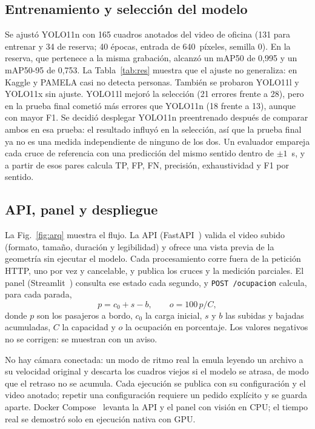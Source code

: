 \documentclass[conference,a4paper]{IEEEtran}
\begin{document}
\subsection{Entrenamiento y selección del modelo}\label{sec:sel}
Se ajustó YOLO11n con 165 cuadros anotados del video de oficina (131 para entrenar y 34 de reserva; 40 épocas, entrada de 640~píxeles, semilla 0). En la reserva, que pertenece a la misma grabación, alcanzó un mAP50 de 0,995 y un mAP50-95 de 0,753. La Tabla~\ref{tab:res} muestra que el ajuste no generaliza: en Kaggle y PAMELA casi no detecta personas. También se probaron YOLO11l y YOLO11x sin ajuste. YOLO11l mejoró la selección (21 errores frente a 28), pero en la prueba final cometió más errores que YOLO11n (18 frente a 13), aunque con mayor F1. Se decidió desplegar YOLO11n preentrenado después de comparar ambos en esa prueba: el resultado influyó en la selección, así que la prueba final ya no es una medida independiente de ninguno de los dos. Un evaluador empareja cada cruce de referencia con una predicción del mismo sentido dentro de $\pm1$~s, y a partir de esos pares calcula TP, FP, FN, precisión, exhaustividad y F1 por sentido.

\subsection{API, panel y despliegue}
La Fig.~\ref{fig:arq} muestra el flujo. La API (FastAPI~\cite{fastapi}) valida el video subido (formato, tamaño, duración y legibilidad) y ofrece una vista previa de la geometría sin ejecutar el modelo. Cada procesamiento corre fuera de la petición HTTP, uno por vez y cancelable, y publica los cruces y la medición parciales. El panel (Streamlit~\cite{streamlit}) consulta ese estado cada segundo, y \texttt{POST /ocupacion} calcula, para cada parada,
\begin{equation}
p = c_0 + s - b, \qquad o = 100\,p/C,
\end{equation}
donde $p$ son los pasajeros a bordo, $c_0$ la carga inicial, $s$ y $b$ las subidas y bajadas acumuladas, $C$ la capacidad y $o$ la ocupación en porcentaje. Los valores negativos no se corrigen: se muestran con un aviso.

No hay cámara conectada: un modo de ritmo real la emula leyendo un archivo a su velocidad original y descarta los cuadros viejos si el modelo se atrasa, de modo que el retraso no se acumula. Cada ejecución se publica con su configuración y el video anotado; repetir una configuración requiere un pedido explícito y se guarda aparte. Docker Compose~\cite{compose} levanta la API y el panel con visión en CPU; el tiempo real se demostró solo en ejecución nativa con GPU.
\end{document}
